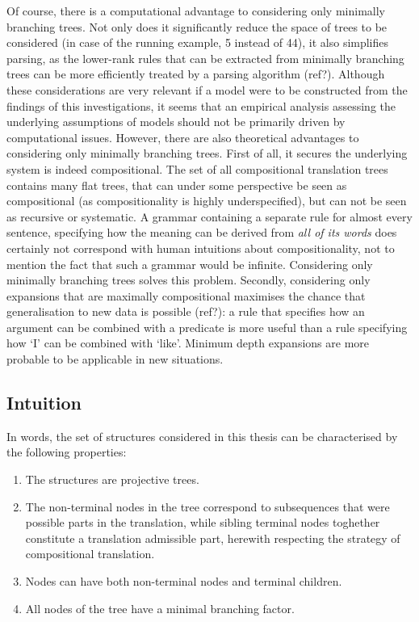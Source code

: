 \documentclass{report}
\theoremstyle{break}
\begin{document}
Of course, there is a computational advantage to considering only minimally branching trees. Not only does it significantly reduce the space of trees to be considered (in case of the running example, 5 instead of 44), it also simplifies parsing, as the lower-rank rules that can be extracted from minimally branching trees  can be more efficiently treated by a parsing algorithm (ref?). Although these considerations are very relevant if a model were to be constructed from the
findings of this investigations, it seems that an empirical analysis assessing the underlying assumptions of models should not be primarily driven by computational issues. However, there are also theoretical advantages to considering only minimally branching trees. First of all, it secures the underlying system is indeed compositional. The set of all compositional translation trees contains many flat trees, that can under some perspective be seen as compositional (as compositionality is highly underspecified), but can not be seen as recursive or systematic. A grammar containing a separate rule for almost every sentence, specifying how the meaning can be derived from \textit{all of its words} does certainly not correspond with human intuitions about compositionality, not to mention the fact that such a grammar would be infinite. Considering only minimally branching trees solves this problem. Secondly, considering only expansions that are maximally compositional maximises the chance that generalisation to new data is possible (ref?): a rule that specifies how an argument can be combined with a predicate is more useful than a rule specifying how `I' can be combined with `like'. Minimum depth expansions are more probable to be applicable in new situations.

\subsection{Intuition}
\label{subsec:intuition}

In words, the set of structures considered in this thesis can be characterised by the following properties:
\begin{enumerate}
\item The structures are projective trees.
\item The non-terminal nodes in the tree correspond to subsequences that were possible parts in the translation, while sibling terminal nodes toghether constitute a translation admissible part, herewith respecting the strategy of compositional translation.
\item Nodes can have both non-terminal nodes and terminal children.
\item All nodes of the tree have a minimal branching factor.
\end{enumerate}
\end{document}
